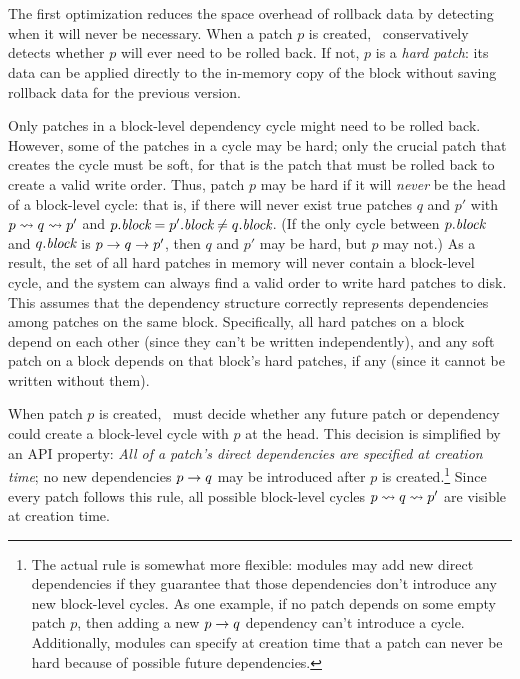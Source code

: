 \subsection{\Nrb\ \ChDescs}
\label{sec:chdescs:nrb}

The first optimization reduces the space overhead of rollback data by
detecting when it will never be necessary.
%
When a patch $p$ is created, \Kudos\ conservatively detects whether $p$
will ever need to be rolled back.
%
If not, $p$ is a \emph{hard patch}: its data can be applied
directly to the in-memory copy of the block without saving rollback data
for the previous version.


Only patches in a block-level dependency cycle might need to be rolled
back.
%
However, some of the patches in a cycle may be hard; only the crucial
patch that creates the cycle must be soft, for that is the patch that
must be rolled back to create a valid write order.
%
Thus, patch $p$ may be hard if it will \emph{never} be the head of a
block-level cycle: that is, if there will never exist true patches $q$
and $p'$ with $p \leadsto q \leadsto p'$ and $p.\textit{block} = p'.\textit{block}
\neq q.\textit{block}$.
%
(If the only cycle between $p.\textit{block}$ and $q.\textit{block}$ is $p
\rightarrow q \rightarrow p'$, then $q$ and $p'$ may be hard, but $p$ may
not.)
%
As a result, the set of all hard patches in memory will never contain
a block-level cycle, and the system can always find a valid order to
write hard patches to disk.
%
This assumes that the dependency structure correctly represents
dependencies among patches on the same block.
%
Specifically, all hard patches on a block depend on each other (since
they can't be written independently), and any soft patch on a block
depends on that block's hard patches, if any (since it cannot be written
without them).


When patch $p$ is created, \Kudos\ must decide whether any future
patch or dependency could create a block-level cycle with $p$ at the
head.
%
This decision is simplified by an API property: \emph{All of a patch's
direct dependencies are specified at creation time};
%
no new dependencies $p \rightarrow q$ may be introduced after $p$ is
created.\footnote{The actual rule is somewhat more flexible: modules may add
  new direct dependencies if they guarantee that those dependencies
  don't introduce any new block-level cycles.  As one example, if no
  patch depends on some empty patch $p$, then adding a new $p
  \rightarrow q$ dependency can't introduce a cycle.  Additionally,
  modules can specify at creation time that a patch can never be hard
  because of possible future dependencies.}
%
Since every patch follows this rule, all possible block-level cycles $p
\leadsto q \leadsto p'$ are visible at creation time.


